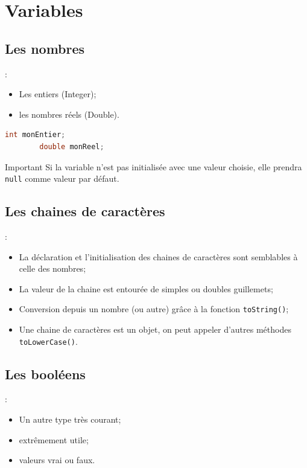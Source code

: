 \documentclass[10pt]{beamer}
\begin{document}
\section{Variables}
\subsection{Les nombres}
\begin{frame}[fragile,t]{\secname : \subsecname}
    \begin{itemize}
        \item Les entiers (Integer);
        \item les nombres réels (Double).
    \end{itemize}
    \begin{lstlisting}[language={c}]
        int monEntier; 
        double monReel;
    \end{lstlisting}
    \begin{alertblock}{Important}
        Si la variable n’est pas initialisée avec une valeur choisie, elle prendra \lstinline[language=c]!null! comme valeur par défaut.
    \end{alertblock}
\end{frame}

\subsection{Les chaines de caractères}
\begin{frame}[fragile,t]{\secname : \subsecname}
    \begin{itemize}
        \item La déclaration et l’initialisation des chaines de caractères sont semblables à celle des nombres;
        \item La valeur de la chaine est entourée de simples ou doubles guillemets;
        \item Conversion depuis un nombre (ou autre) grâce à la fonction \lstinline[language=sql]!toString()!;
        \item Une chaine de caractères est un objet, on peut appeler d'autres méthodes \lstinline[language=sql]!toLowerCase()!.
    \end{itemize}
    
\end{frame}

\subsection{Les booléens}
\begin{frame}[fragile,t]{\secname : \subsecname}
    \begin{itemize}
        \item Un autre type très courant;
        \item extrêmement utile;
        \item valeurs vrai ou faux.
    \end{itemize}
    
\end{frame}
\end{document}
